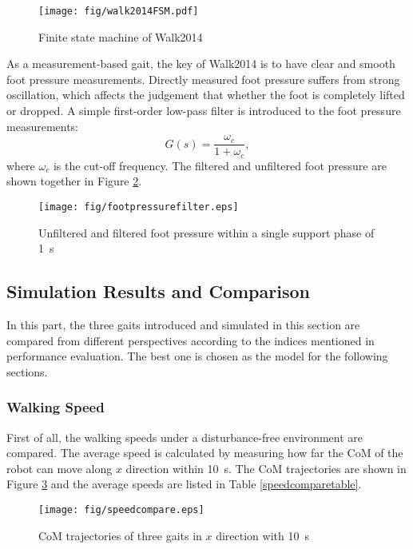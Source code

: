 \begin{figure}[H]
	\centering
	\texttt{[image: fig/walk2014FSM.pdf]}
	\caption{Finite state machine of Walk2014}
	\label{walk2014finitestatemachine}
\end{figure}


As a measurement-based gait, the key of Walk2014 is to have clear and smooth foot pressure measurements. Directly measured foot pressure suffers from strong oscillation, which affects the judgement that whether the foot is completely lifted or dropped. A simple first-order low-pass filter is introduced to the foot pressure measurements:
\begin{equation}
G(s)=\frac{\omega_c}{1+\omega_c},
\end{equation} 
where $ \omega_c $ is the cut-off frequency. The filtered and unfiltered foot pressure are shown together in Figure {\ref{footpressurefilter}}. 
\begin{figure}[H]
	\centering
	\texttt{[image: fig/footpressurefilter.eps]}
	\caption[Unfiltered and filtered foot pressure within a single support phase]{Unfiltered and filtered foot pressure within a single support phase of \SI{1}{\second}}
	\label{footpressurefilter}
\end{figure}


\subsection{Simulation Results and Comparison}
In this part, the three gaits introduced and simulated in this section are compared from different perspectives according to the indices mentioned in performance evaluation. The best one is chosen as the model for the following sections.

\subsubsection{Walking Speed}
First of all, the walking speeds under a disturbance-free environment are compared. The average speed is calculated by measuring how far the CoM of the robot can move along $ x $ direction within \SI{10}{\second}. The CoM trajectories are shown in Figure {\ref{speedcomparefigure}} and the average speeds are listed in Table {\ref{speedcomparetable}}.

\begin{figure}[H]
	\centering
	\texttt{[image: fig/speedcompare.eps]}
	\caption{CoM trajectories of three gaits in $ x $ direction with \SI{10}{\second}}
	\label{speedcomparefigure}
\end{figure}

